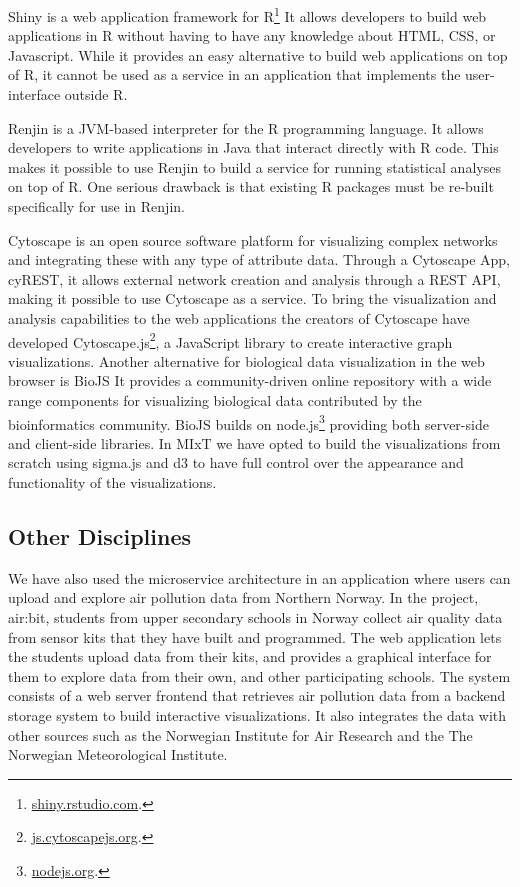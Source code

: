 Shiny is a web application framework for R\footnote{\url{shiny.rstudio.com}.}
It allows developers to build web applications in R without having to have any
knowledge about HTML, CSS, or Javascript. While it provides an easy alternative
to build web applications on top of R, it cannot be used as a service in an
application that implements the user-interface outside R.  

Renjin is a JVM-based interpreter for the R programming language.\cite{renjin}
It allows developers to write applications in Java that interact directly with R
code. This makes it possible to use Renjin to build a service for running
statistical analyses on top of R. One serious drawback is that existing R
packages must be re-built specifically for use in Renjin. 

Cytoscape is an open source software platform for visualizing complex networks
and integrating these with any type of attribute
data.\cite{shannon2003cytoscape} Through a Cytoscape App, cyREST, it allows
external network creation and analysis through a REST API\cite{ono2015cyrest},
making it possible to use Cytoscape as a service.  To bring the visualization
and analysis capabilities to the web applications the creators of Cytoscape have
developed Cytoscape.js\footnote{\url{js.cytoscapejs.org}.}, a JavaScript library
to create interactive graph visualizations.  Another alternative for biological
data visualization in the web browser is BioJS It provides a community-driven
online repository with a wide range components for visualizing biological data
contributed by the bioinformatics community.\cite{gomez2013biojs} BioJS builds
on node.js\footnote{\url{nodejs.org}.} providing both server-side and
client-side libraries. In MIxT we have opted to build the visualizations from
scratch using sigma.js and d3 to have full control over the appearance and
functionality of the visualizations. 

\subsection{Other Disciplines}
We have also used the microservice architecture in an application where users
can upload and explore air pollution data from Northern
Norway.\cite{fjukstad2018low} In the project, air:bit, students from upper
secondary schools in Norway collect air quality data from sensor kits that they
have built and programmed. The web application lets the students upload data
from their kits, and provides a graphical interface for them to explore data
from their own, and other participating schools. The system consists of a web
server frontend that retrieves air pollution data from a backend storage system
to build interactive visualizations. It also integrates the data with other
sources such as the Norwegian Institute for Air Research and the The Norwegian
Meteorological Institute. 

